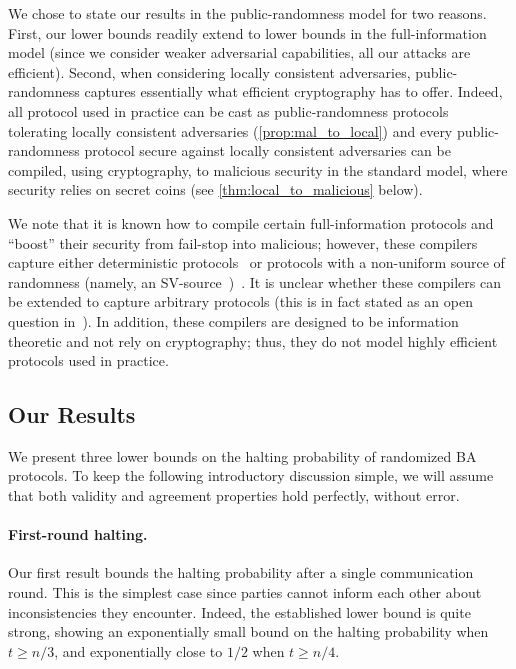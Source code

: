 We chose to state our results in the public-randomness model for two reasons. First, our lower bounds readily extend to lower bounds in the full-information model (since we consider weaker adversarial capabilities, \eg all our attacks are efficient). Second, when considering locally consistent adversaries, public-randomness captures essentially what efficient cryptography has to offer. Indeed, all protocol used in practice can be cast as public-randomness protocols tolerating locally consistent adversaries (\cref{prop:mal_to_local}) and every public-randomness protocol secure against locally consistent adversaries can be compiled, using cryptography, to malicious security in the standard model, where security relies on secret coins (see \cref{thm:local_to_malicious} below).

We note that it is known how to compile certain full-information protocols and ``boost'' their security from fail-stop into malicious; however, these compilers capture either deterministic protocols~\cite{Hadzilacos87,Bracha84,NT90} or protocols with a non-uniform source of randomness (namely, an SV-source~\cite{SV84})~\cite{GPV06}. It is unclear whether these compilers can be extended to capture arbitrary protocols (this is in fact stated as an open question in~\cite{Bracha84,GPV06}).
In addition, these compilers are designed to be information theoretic and not rely on cryptography; thus, they do not model highly efficient protocols used in practice.

\subsection{Our Results}\label{sec:intro:ourResult}
We present three lower bounds on the halting probability of randomized BA protocols.
To keep the following introductory discussion simple, we will assume that both validity and agreement properties hold perfectly, without error.

\paragraph{First-round halting.}
Our first result bounds the halting probability after a single communication round. This is the simplest case since parties cannot inform each other about inconsistencies they encounter. Indeed, the established lower bound is quite strong, showing an exponentially small bound on the halting probability when $t\geq n/3$, and exponentially close to $1/2$ when $t\geq n/4$.

